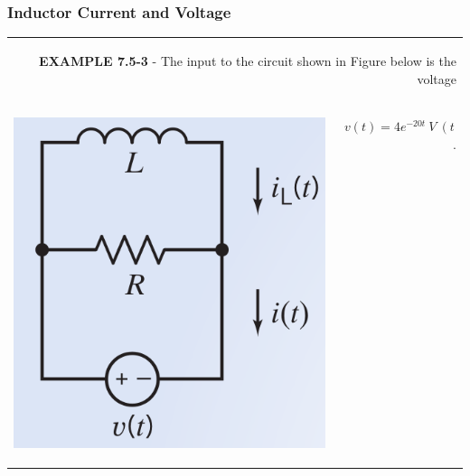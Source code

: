 \documentclass[aspectratio=169]{beamer}
\begin{document}
\begin{frame}[fragile]
\frametitle{Inductor Current and Voltage}
\begin{tabular}{r}

	    \begin{columns}
		\begin{column}{1\textwidth}
		\textbf{EXAMPLE 7.5-3} - The input to the circuit shown in Figure below is the voltage 
		\end{column}
	  \end{columns}\\
	    \begin{columns}
	    
	    	\begin{column}{.3\textwidth}  %
		    \begin{center}
    	  		\includegraphics[height=.8\textwidth]{figura12.png}	
		    \end{center}
		\end{column}
	    
		\begin{column}{.5\textwidth}
		  \begin{center} $v(t)=4e^{-20t} \ V \ (t>0)$.\end{center}
		\end{column}

	\end{columns}\\
	

\end{tabular}
\end{frame}
\end{document}
